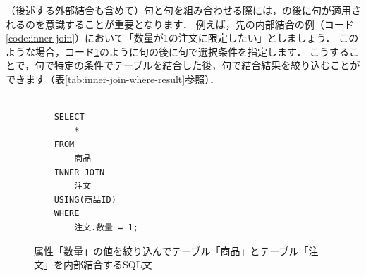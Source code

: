 （後述する外部結合も含めて）句と句を組み合わせる際には，の後に句が適用されるのを意識することが重要となります．
例えば，先の内部結合の例（コード\ref{code:inner-join}）において「数量が1の注文に限定したい」としましょう．
このような場合，コード\ref{code:sql-inner-join-where}のように句の後に句で選択条件を指定します．
こうすることで，句で特定の条件でテーブルを結合した後，句で結合結果を絞り込むことができます（表\ref{tab:inner-join-where-result}参照）．
\begin{figure}[!htbp]
    \begin{verbatim}

    SELECT
        *
    FROM
        商品
    INNER JOIN
        注文
    USING(商品ID)
    WHERE
        注文.数量 = 1;

    \end{verbatim}
    \captionsetup{name=コード}
    \caption{属性「数量」の値を絞り込んでテーブル「商品」とテーブル「注文」を内部結合するSQL文}
    \label{code:sql-inner-join-where}
\end{figure}
\begin{table}[!htbp]
    \centering
    \caption{属性「数量」の値を絞り込んでテーブル「商品」とテーブル「注文」を内部結合するSQL文の実行結果}
    \label{tab:inner-join-where-result}
\end{table}



